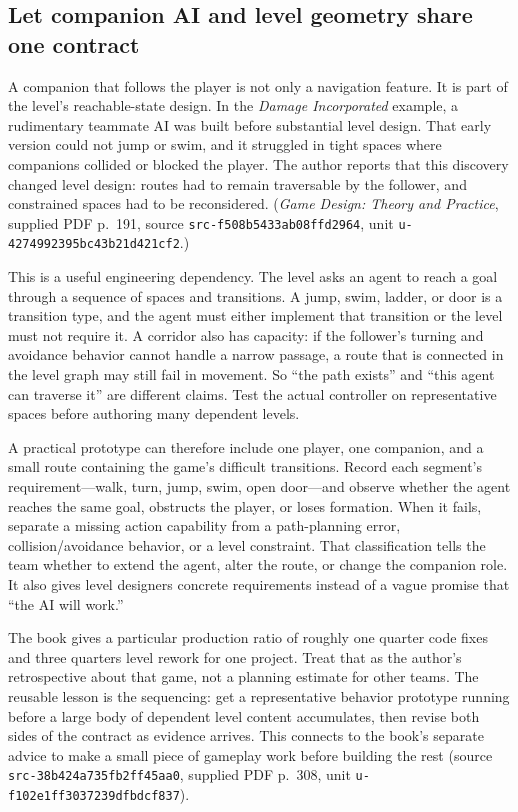 \subsection{Let companion AI and level geometry share one contract}\label{let-companion-ai-and-level-geometry-share-one-contract}

A companion that follows the player is not only a navigation feature. It is part of the level's reachable-state design. In the \emph{Damage Incorporated} example, a rudimentary teammate AI was built before substantial level design. That early version could not jump or swim, and it struggled in tight spaces where companions collided or blocked the player. The author reports that this discovery changed level design: routes had to remain traversable by the follower, and constrained spaces had to be reconsidered. (\emph{Game Design: Theory and Practice}, supplied PDF p.~191, source \texttt{src-f508b5433ab08ffd2964}, unit \texttt{u-4274992395bc43b21d421cf2}.)

This is a useful engineering dependency. The level asks an agent to reach a goal through a sequence of spaces and transitions. A jump, swim, ladder, or door is a transition type, and the agent must either implement that transition or the level must not require it. A corridor also has capacity: if the follower's turning and avoidance behavior cannot handle a narrow passage, a route that is connected in the level graph may still fail in movement. So ``the path exists'' and ``this agent can traverse it'' are different claims. Test the actual controller on representative spaces before authoring many dependent levels.

A practical prototype can therefore include one player, one companion, and a small route containing the game's difficult transitions. Record each segment's requirement---walk, turn, jump, swim, open door---and observe whether the agent reaches the same goal, obstructs the player, or loses formation. When it fails, separate a missing action capability from a path-planning error, collision/avoidance behavior, or a level constraint. That classification tells the team whether to extend the agent, alter the route, or change the companion role. It also gives level designers concrete requirements instead of a vague promise that ``the AI will work.''

The book gives a particular production ratio of roughly one quarter code fixes and three quarters level rework for one project. Treat that as the author's retrospective about that game, not a planning estimate for other teams. The reusable lesson is the sequencing: get a representative behavior prototype running before a large body of dependent level content accumulates, then revise both sides of the contract as evidence arrives. This connects to the book's separate advice to make a small piece of gameplay work before building the rest (source \texttt{src-38b424a735fb2ff45aa0}, supplied PDF p.~308, unit \texttt{u-f102e1ff3037239dfbdcf837}).

